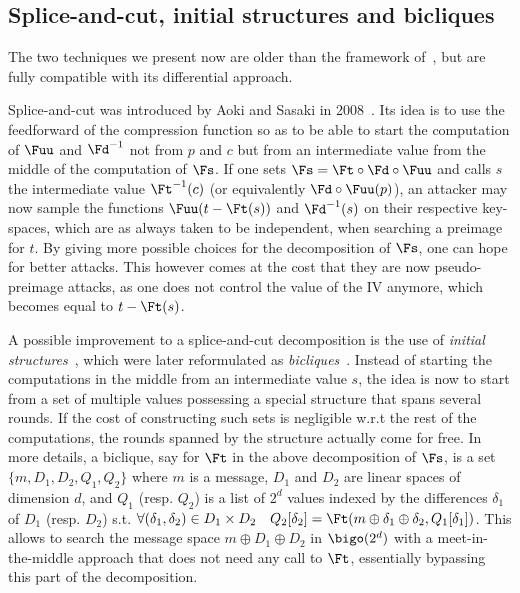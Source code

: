 \subsection{Splice-and-cut, initial structures and bicliques}

The two techniques we present now are older than the framework of~\cite{DBLP:conf/crypto/KnellwolfK12}, but are fully compatible with its differential approach.

Splice-and-cut was introduced by Aoki and Sasaki in 2008~\cite{AS08}. Its idea is to use the feedforward of the compression
function so as to
be able to start the computation of $\Fuu$ and $\Fd^{-1}$ not from $p$ and $c$ but from an intermediate value from the middle of the computation
of $\Fs$. If one sets $\Fs = \Ft \circ \Fd \circ \Fuu$ and calls $s$ the intermediate value $\Ft^{-1}(c)$ (or equivalently $\Fd \circ \Fuu(p)$),
an attacker may now sample the functions $\Fuu(t - \Ft(s))$ and $\Fd^{-1}(s)$ on their respective key-spaces, which are as always taken to
be independent, when searching
a preimage for $t$.
By giving more possible choices for the decomposition of $\Fs$, one can hope for better attacks. This however comes at the cost that they are now
pseudo-preimage attacks, as one does not control the value of the IV anymore, which becomes equal to $t - \Ft(s)$.

A possible improvement to a splice-and-cut decomposition is the use of \emph{initial structures}~\cite{SA09}, which were later reformulated as \emph{bicliques}~\cite{KRS12}.
Instead of starting the computations in the middle from an intermediate value $s$, the idea is now to start from a set of multiple values
possessing a special structure that spans several rounds. If the cost of constructing such sets is negligible w.r.t the rest of the computations,
the rounds spanned by the structure actually come for free. In more details, a biclique, say for $\Ft$ in the above
decomposition of $\Fs$, is a set $\{m,D_1,D_2,Q_1,Q_2\}$ where $m$ is a message,
$D_1$ and $D_2$ are linear spaces of dimension $d$, and $Q_1$ (resp. $Q_2$) is a list of $2^d$ values indexed by the differences $\delta_1$
of $D_1$ (resp. $D_2$) s.t. $\forall (\delta_1, \delta_2) \in D_1 \times D_2\quad Q_2[\delta_2] = \Ft(m \oplus \delta_1 \oplus \delta_2, Q_1[\delta_1])$.
This allows to search the message space $m \oplus D_1 \oplus D_2$ in $\bigo(2^d)$
with a meet-in-the-middle approach that does not need any call to $\Ft$,
essentially bypassing this part of the decomposition.
